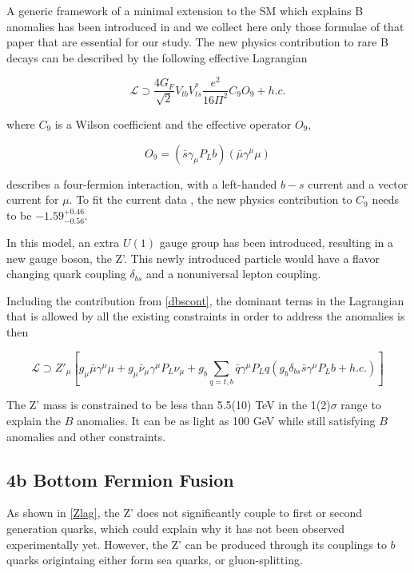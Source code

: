 A generic framework of a minimal extension to the SM which explains B anomalies has been introduced in \cite{Dalchenko:2017shg} and we collect here only those formulae of that paper that are essential for our study. The new physics contribution to rare B decays can be described by the following effective Lagrangian 

\begin{equation}
\label{dbscont}
\mathcal{L} \supset \frac{4G_{F}}{\sqrt{2}}V_{tb}V_{ts}^{*}\frac{e^{2}}{16\Pi^{2}}C_{9}O_{9} + h.c.
\end{equation}

where $C_{9}$ is a Wilson coefficient and the effective operator $O_{9}$,

\begin{equation}
O_{9} = (\bar{s}\gamma_{\mu}P_{L}b)(\bar{\mu}\gamma^{\mu}\mu)
\end{equation}

describes a four-fermion interaction, with a left-handed $b-s$ current and a vector current for $\mu$. To fit the current data \cite{PhysRevD.96.055008}, the new physics contribution to $C_{9}$ needs to be $-1.59_{-0.56}^{+0.46}$.

In this model, an extra $U(1)$ gauge group has been introduced, resulting in a new gauge boson, the Z'. This newly introduced particle would have a flavor changing quark coupling $\delta_{bs}$ and a nonuniversal lepton coupling.

Including the contribution from \ref{dbscont}, the dominant terms in the Lagrangian that is allowed by all the existing constraints in order to address the anomalies is then

\begin{equation}
\label{Zlag}
\mathcal{L} \supset Z'_{\mu}[g_{\mu}\bar{\mu}\gamma^{\mu}\mu + g_{\mu}\bar{\nu}_{\mu}\gamma^{\mu}P_{L}\nu_{\mu} + g_{b}\sum_{q=t,b}\bar{q}\gamma^{\mu}P_{L}q (g_{b}\delta_{bs}\bar{s}\gamma^{\mu}P_{L}b +h.c.)]
\end{equation}

The Z' mass is constrained to be less than 5.5(10) TeV in the 1(2)$\sigma$ range to explain the $B$ anomalies. It can be as light as 100 GeV while still satisfying $B$ anomalies and other constraints\cite{PhysRevD.89.095033}.

\subsection{4b Bottom Fermion Fusion}

As shown in \ref{Zlag}, the Z' does not significantly couple to first or second generation quarks, which could explain why it has not been observed experimentally yet. However, the Z' can be produced through its couplings to $b$ quarks origintaing either form sea quarks, or gluon-splitting. 

